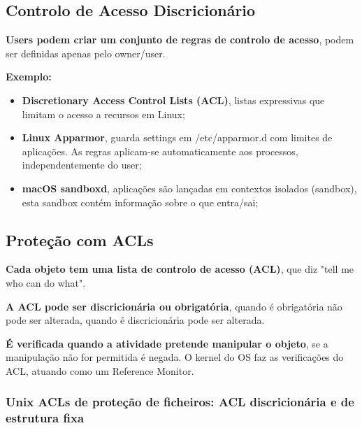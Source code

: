 \documentclass{article}
\begin{document}
\pagebreak

\subsection{Controlo de Acesso Discricionário}

\begin{flushleft}
  \textbf{Users podem criar um conjunto de regras de controlo de acesso},
  podem ser definidas apenas pelo owner/user.

  \vspace{2mm}

  \textbf{Exemplo:}

  \begin{itemize}
    \item \textbf{Discretionary Access Control Lists (ACL)}, listas expressivas que
    limitam o acesso a recursos em Linux;
    \item \textbf{Linux Apparmor}, guarda settings em /etc/apparmor.d com limites de
    aplicações. As regras aplicam-se automaticamente aos processos, independentemente
    do user;
    \item \textbf{macOS sandboxd}, aplicações são lançadas em contextos isolados (sandbox),
    esta sandbox contém informação sobre o que entra/sai;
  \end{itemize}
\end{flushleft}

\subsection{Proteção com ACLs}

\begin{flushleft}
  \textbf{Cada objeto tem uma lista de controlo de acesso (ACL)}, que diz
  "tell me who can do what".

  \vspace{2mm}

  \textbf{A ACL pode ser discricionária ou obrigatória}, quando é obrigatória
  não pode ser alterada, quando é discricionária pode ser alterada.

  \vspace{2mm}

  \textbf{É verificada quando a atividade pretende manipular
  o objeto}, se a manipulação não for permitida é negada. O kernel do OS
  faz as verificações do ACL, atuando como um Reference Monitor.
\end{flushleft}

\subsubsection{Unix ACLs de proteção de ficheiros: ACL discricionária e de estrutura fixa}
\end{document}

